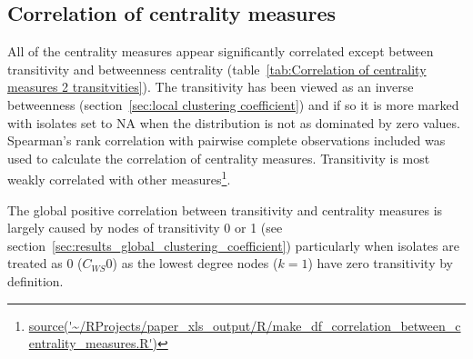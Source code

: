 





\subsection{Correlation of centrality measures}

All of the centrality measures appear significantly correlated except between transitivity and betweenness centrality (table~\ref{tab:Correlation of centrality measures 2 transitvities}). The transitivity has been viewed as an inverse betweenness (section~\ref{sec:local clustering coefficient}) and if so it is more marked with isolates set to NA when the distribution is not as dominated by zero values. Spearman's rank correlation with pairwise complete observations included was used to calculate the correlation of centrality measures. Transitivity is most weakly correlated with other measures\footnote{ \url{source('~/RProjects/paper_xls_output/R/make_df_correlation_between_centrality_measures.R')}}.

The global positive correlation between transitivity and centrality measures is largely caused by nodes of transitivity 0 or 1 (see section~\ref{sec:results_global_clustering_coefficient}) particularly when isolates are treated as 0 ($C_{WS}0$) as the lowest degree nodes ($k=1$) have zero transitivity by definition.





